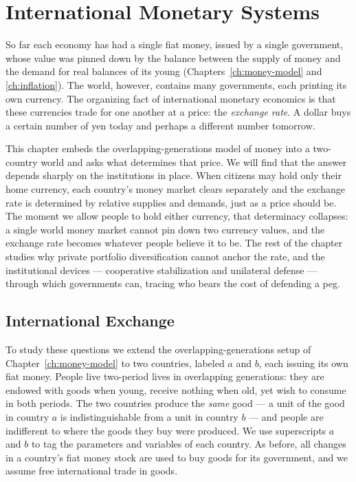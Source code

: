 \chapter{International Monetary Systems}
\label{ch:international}

So far each economy has had a single fiat money, issued by a single government, whose value was pinned down by the balance between the supply of money and the demand for real balances of its young (Chapters~\ref{ch:money-model} and \ref{ch:inflation}). The world, however, contains many governments, each printing its own currency. The organizing fact of international monetary economics is that these currencies trade for one another at a price: the \emph{exchange rate}. A dollar buys a certain number of yen today and perhaps a different number tomorrow.

This chapter embeds the overlapping-generations model of money into a two-country world and asks what determines that price. We will find that the answer depends sharply on the institutions in place. When citizens may hold only their home currency, each country's money market clears separately and the exchange rate is determined by relative supplies and demands, just as a price should be. The moment we allow people to hold either currency, that determinacy collapses: a single world money market cannot pin down two currency values, and the exchange rate becomes whatever people believe it to be. The rest of the chapter studies why private portfolio diversification cannot anchor the rate, and the institutional devices --- cooperative stabilization and unilateral defense --- through which governments can, tracing who bears the cost of defending a peg.

\section{International Exchange}

To study these questions we extend the overlapping-generations setup of Chapter~\ref{ch:money-model} to two countries, labeled $a$ and $b$, each issuing its own fiat money. People live two-period lives in overlapping generations: they are endowed with goods when young, receive nothing when old, yet wish to consume in both periods. The two countries produce the \emph{same} good --- a unit of the good in country $a$ is indistinguishable from a unit in country $b$ --- and people are indifferent to where the goods they buy were produced. We use superscripts $a$ and $b$ to tag the parameters and variables of each country. As before, all changes in a country's fiat money stock are used to buy goods for its government, and we assume free international trade in goods.


